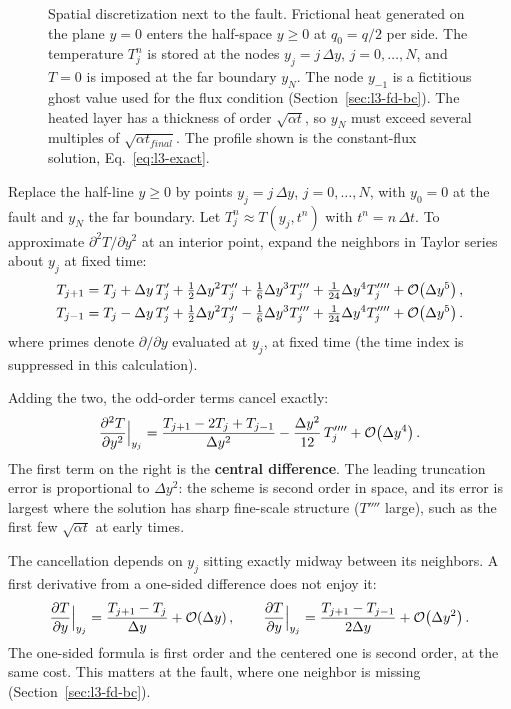 \begin{figure}[ht]
\caption{Spatial discretization next to the fault. Frictional heat generated on the plane $y=0$ enters the half-space $y\ge0$ at $q_0=q/2$ per side. The temperature $T_j^n$ is stored at the nodes $y_j=j\,\Delta y$, $j=0,\dots,N$, and $T=0$ is imposed at the far boundary $y_N$. The node $y_{-1}$ is a fictitious ghost value used for the flux condition (Section~\ref{sec:l3-fd-bc}). The heated layer has a thickness of order $\sqrt{\alpha t}$, so $y_N$ must exceed several multiples of $\sqrt{\alpha t_{final}}$. The profile shown is the constant-flux solution, Eq.~\eqref{eq:l3-exact}.}
\label{fig:l3-grid}
\end{figure}

Replace the half-line $y\ge0$ by points $y_j=j\,\Delta y$, $j=0,\dots,N$, with $y_0=0$ at the fault and $y_N$ the far boundary. Let $T_j^n\approx T(y_j,t^n)$ with $t^n=n\,\Delta t$. To approximate $\partial^2T/\partial y^2$ at an interior point, expand the neighbors in Taylor series about $y_j$ at fixed time:
\begin{align}
T_{j+1}&=T_j+\Delta y\,T_j'+\tfrac12\Delta y^2T_j''+\tfrac16\Delta y^3T_j'''+\tfrac1{24}\Delta y^4T_j''''+\mathcal{O}\!\left(\Delta y^5\right),\\
T_{j-1}&=T_j-\Delta y\,T_j'+\tfrac12\Delta y^2T_j''-\tfrac16\Delta y^3T_j'''+\tfrac1{24}\Delta y^4T_j''''+\mathcal{O}\!\left(\Delta y^5\right).
\end{align}
where primes denote $\partial/\partial y$ evaluated at $y_j$, at fixed time (the time index is suppressed in this calculation).

Adding the two, the odd-order terms cancel exactly:
\begin{equation}
\frac{\partial^2T}{\partial y^2}\Big|_{y_j}=\frac{T_{j+1}-2T_j+T_{j-1}}{\Delta y^2}-\frac{\Delta y^2}{12}\,T_j''''+\mathcal{O}\!\left(\Delta y^4\right).
\label{eq:l3-central}
\end{equation}
The first term on the right is the \textbf{central difference}. The leading truncation error is proportional to $\Delta y^2$: the scheme is second order in space, and its error is largest where the solution has sharp fine-scale structure ($T''''$ large), such as the first few $\sqrt{\alpha t}$ at early times.

The cancellation depends on $y_j$ sitting exactly midway between its neighbors. A first derivative from a one-sided difference does not enjoy it:
\begin{equation}
\frac{\partial T}{\partial y}\Big|_{y_j}=\frac{T_{j+1}-T_j}{\Delta y}+\mathcal{O}\!\left(\Delta y\right),\qquad
\frac{\partial T}{\partial y}\Big|_{y_j}=\frac{T_{j+1}-T_{j-1}}{2\Delta y}+\mathcal{O}\!\left(\Delta y^2\right).
\label{eq:l3-first}
\end{equation}
The one-sided formula is first order and the centered one is second order, at the same cost. This matters at the fault, where one neighbor is missing (Section~\ref{sec:l3-fd-bc}).

